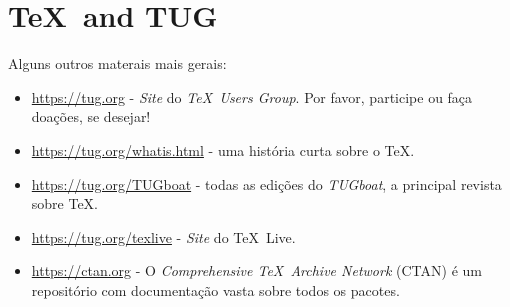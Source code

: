 \documentclass[11pt, oneside]{article}
\begin{document}
\section{\TeX\ and TUG}

Alguns outros materais mais gerais:

\begin{itemize}
	
\item \url{https://tug.org} - \textit{Site} do \textit{\TeX\ Users Group}. Por favor, participe ou faça doações, se desejar!

\item \url{https://tug.org/whatis.html} - uma história curta sobre o \TeX.

\item \url{https://tug.org/TUGboat} - todas as edições do \textsl{TUGboat}, a principal revista sobre \TeX.

\item \url{https://tug.org/texlive} - \textit{Site} do \TeX\ Live.

\item \url{https://ctan.org} - O \textit{Comprehensive \TeX\ Archive Network}
(CTAN) é um repositório com documentação vasta sobre todos os pacotes.

\end{itemize}
\end{document}
